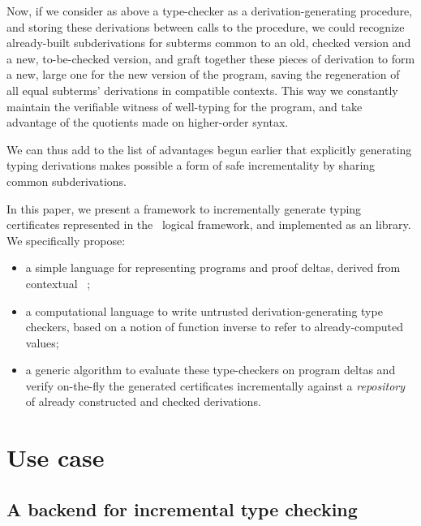 \documentclass[9pt]{sigplanconf}
\begin{document}
Now, if we consider as above a type-checker as a derivation-generating
procedure, and storing these derivations between calls to the
procedure, we could recognize already-built subderivations for
subterms common to an old, checked version and a new, to-be-checked
version, and graft together these pieces of derivation to form a new,
large one for the new version of the program, saving the regeneration
of all equal subterms' derivations in compatible contexts. This way we
constantly maintain the verifiable witness of well-typing for the
program, and take advantage of the quotients made on higher-order
syntax.

We can thus add to the list of advantages begun earlier that
explicitly generating typing derivations makes possible a form of safe
incrementality by sharing common subderivations.

In this paper, we present a framework to incrementally generate typing
certificates represented in the \LF\ logical framework, and implemented
as an  library. We specifically propose:
\begin{itemize}
\item a simple language for representing programs and proof
  deltas, derived from contextual \LF\ \cite{nanevski2008contextual};
\item a computational language to write untrusted
  derivation-generating type checkers, based on a notion of function
  inverse %
  to refer to already-computed values;
\item a generic algorithm to evaluate these type-checkers on program
  deltas and verify on-the-fly the generated certificates
  incrementally against a \emph{repository} of already constructed and
  checked derivations.
\end{itemize}

\section{Use case}

\subsection{A backend for incremental type checking}
\label{sec:use-incremental}
\end{document}
